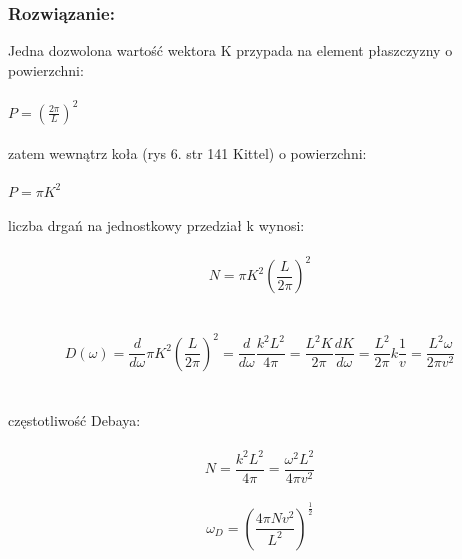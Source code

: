 \subsubsection*{Rozwiązanie:}
Jedna dozwolona wartość wektora K przypada na element płaszczyzny o powierzchni:
\\
\\
$P=(\frac{2\pi}{L})^2$
\\
\\
zatem wewnątrz koła (rys 6. str 141 Kittel) o powierzchni:
\\
\\
$P=\pi K^2$
\\
\\
liczba drgań na jednostkowy przedział k wynosi:
\\
\\
\begin{equation}
N=\pi K^2(\frac{L}{2\pi})^2
\end{equation}
\\
\\
\begin{equation}
D(\omega)=\frac{d}{d\omega} \pi K^2(\frac{L}{2\pi})^2=\frac{d}{d\omega}\frac{k^2L^2}{4\pi}=\frac{L^2K}{2\pi}\frac{dK}{d\omega}=\frac{L^2}{2\pi}k\frac{1}{v}=\frac{L^2\omega}{2\pi v^2}
\end{equation}
\\
\\
częstotliwość Debaya:
\\
\\
\begin {equation}
N=\frac{k^2L^2}{4\pi}=\frac{\omega^2L^2}{4\pi v^2}
\end{equation}
\\
\begin{equation}
\omega_D=(\frac{4\pi Nv^2}{L^2})^{\frac{1}{2}}
\end{equation}
